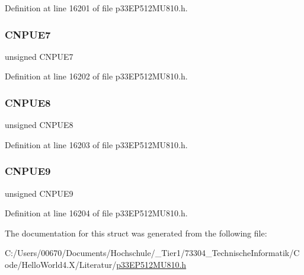 Definition at line 16201 of file p33\+E\+P512\+M\+U810.\+h.

\mbox{\label{structtag_c_n_p_u_e_b_i_t_s_aee832be830e5768dc2b7065ff754b7a1}} 
\subsubsection{\texorpdfstring{C\+N\+P\+U\+E7}{CNPUE7}}
{\footnotesize\ttfamily unsigned C\+N\+P\+U\+E7}



Definition at line 16202 of file p33\+E\+P512\+M\+U810.\+h.

\mbox{\label{structtag_c_n_p_u_e_b_i_t_s_a1cda77913afbf99229124e22b9139f84}} 
\subsubsection{\texorpdfstring{C\+N\+P\+U\+E8}{CNPUE8}}
{\footnotesize\ttfamily unsigned C\+N\+P\+U\+E8}



Definition at line 16203 of file p33\+E\+P512\+M\+U810.\+h.

\mbox{\label{structtag_c_n_p_u_e_b_i_t_s_a471a24fd272f5564de0266b763b08d3b}} 
\subsubsection{\texorpdfstring{C\+N\+P\+U\+E9}{CNPUE9}}
{\footnotesize\ttfamily unsigned C\+N\+P\+U\+E9}



Definition at line 16204 of file p33\+E\+P512\+M\+U810.\+h.



The documentation for this struct was generated from the following file\+:\begin{DoxyCompactItemize}
\item 
C\+:/\+Users/00670/\+Documents/\+Hochschule/\+\_\+\+Tier1/73304\+\_\+\+Technische\+Informatik/\+Code/\+Hello\+World4.\+X/\+Literatur/\hyperlink{p33_e_p512_m_u810_8h}{p33\+E\+P512\+M\+U810.\+h}\end{DoxyCompactItemize}
